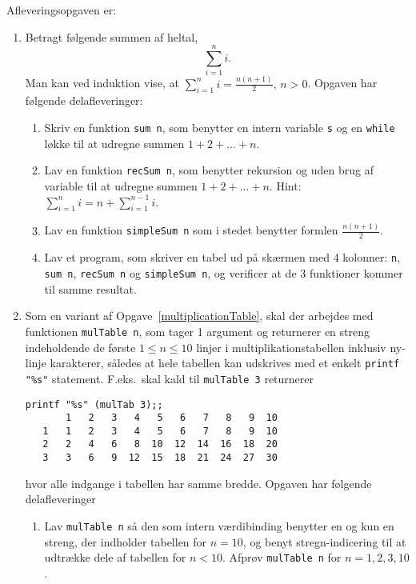 \documentclass[a4paper,12pt]{article}
\begin{document}
Afleveringsopgaven er:
\begin{enumerate}[label=3i.\arabic*,start=0]
\item Betragt følgende summen af heltal,
  \begin{equation}
    \sum_{i=1}^n i.
  \end{equation}
  Man kan ved induktion vise, at $\sum_{i=1}^n i = \frac{n(n+1)}{2},\, n>0$. Opgaven har følgende delafleveringer:
  \begin{enumerate}
  \item \label{sum} Skriv en funktion \lstinline!sum n!, som benytter en intern variable \lstinline!s! og en \lstinline!while! løkke til at udregne summen $1 + 2 + \dots + n$.
  \item Lav en funktion \lstinline!recSum n!, som benytter rekursion og uden brug af variable til at udregne summen $1 + 2 + \dots + n$. Hint: $\sum_{i=1}^n i = n + \sum_{i=1}^{n-1} i$.
  \item Lav en funktion \lstinline!simpleSum n! som i stedet benytter formlen $\frac{n(n+1)}{2}$.
  \item Lav et program, som skriver en tabel ud på skærmen med 4 kolonner: \lstinline!n!, \lstinline!sum n!, \lstinline!recSum n! og \lstinline!simpleSum n!, og verificer at de 3 funktioner kommer til samme resultat.
  \end{enumerate}
\item Som en variant af Opgave~\ref{multiplicationTable}, skal der arbejdes med funktionen \lstinline!mulTable n!, som tager 1 argument og returnerer en streng indeholdende de første $1\leq n\leq 10$ linjer i multiplikationstabellen inklusiv ny-linje karakterer, således at hele tabellen kan udskrives med et enkelt \lstinline!printf "%s"! statement. F.eks.\ skal kald til \lstinline!mulTable 3! returnerer
\begin{lstlisting}[caption=Example of use and output from \lstinline!mulTab!,label=mulTab]
printf "%s" (mulTab 3);;
       1   2   3   4   5   6   7   8   9  10
   1   1   2   3   4   5   6   7   8   9  10
   2   2   4   6   8  10  12  14  16  18  20
   3   3   6   9  12  15  18  21  24  27  30
\end{lstlisting}
  hvor alle indgange i tabellen har samme bredde. Opgaven har følgende delafleveringer
  \begin{enumerate}
  \item Lav \lstinline!mulTable n! så den som intern værdibinding benytter en og kun en streng, der indholder tabellen for $n=10$, og benyt stregn-indicering til at udtrække dele af tabellen for $n<10$.  Afprøv \lstinline!mulTable n! for $n= 1, 2, 3, 10$.

\end{enumerate}
\end{enumerate}
\end{document}
